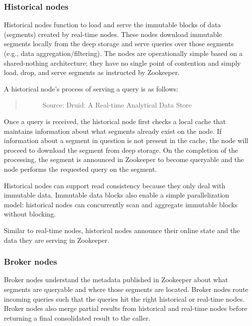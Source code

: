 \documentclass[letterpaper,10pt,english]{sphinxmanual}
\begin{document}
\subsubsection{Historical nodes}
\label{\detokenize{discovery/part01/druid_nodes:historical}}\label{\detokenize{discovery/part01/druid_nodes:historical-nodes}}
Historical nodes function to load and serve the immutable blocks of data (segments) created by real-time nodes. These nodes download immutable segments locally from the deep storage and serve queries over those segments (e.g., data aggregation/filtering). The nodes are operationally simple based on a shared-nothing architecture; they have no single point of contention and simply load, drop, and serve segments as instructed by Zookeeper.

A historical node’s process of serving a query is as follows:
\begin{quote}

\begin{figure}[H]
\centering
\capstart

\noindent{}
\caption{Source: Druid: A Real-time Analytical Data Store}\label{\detokenize{discovery/part01/druid_nodes:id6}}\end{figure}
\end{quote}

Once a query is received, the historical node first checks a local cache that maintains information about what segments already exist on the node. If information about a segment in question is not present in the cache, the node will proceed to download the segment from deep storage. On the completion of the processing, the segment is announced in Zookeeper to become queryable and the node performs the requested query on the segment.

Historical nodes can support read consistency because they only deal with immutable data. Immutable data blocks also enable a simple parallelization model: historical nodes can concurrently scan and aggregate immutable blocks without blocking.

Similar to real-time nodes, historical nodes announce their online state and the data they are serving in Zookeeper.


\subsubsection{Broker nodes}
\label{\detokenize{discovery/part01/druid_nodes:broker}}\label{\detokenize{discovery/part01/druid_nodes:broker-nodes}}
Broker nodes understand the metadata published in Zookeeper about what segments are queryable and where those segments are located. Broker nodes route incoming queries such that the queries hit the right historical or real-time nodes. Broker nodes also merge partial results from historical and real-time nodes before returning a final consolidated result to the caller.
\end{document}

